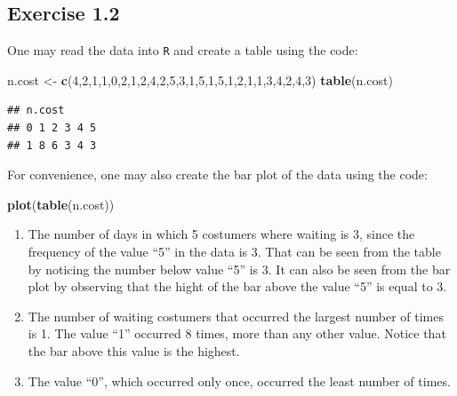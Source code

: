 \documentclass[
]{krantz}
\makeatletter
\newenvironment{Shaded}{\begin{snugshade}}{\end{snugshade}}
\newcommand{\DecValTok}[1]{\textcolor[rgb]{0.00,0.00,0.81}{#1}}
\newcommand{\KeywordTok}[1]{\textcolor[rgb]{0.13,0.29,0.53}{\textbf{#1}}}
\newcommand{\NormalTok}[1]{#1}
\newcommand{\StringTok}[1]{\textcolor[rgb]{0.31,0.60,0.02}{#1}}
\newenvironment{kframe}{%
\medskip{}
\setlength{\fboxsep}{.8em}
 \def\at@end@of@kframe{}%
 \ifinner\ifhmode%
  \def\at@end@of@kframe{\end{minipage}}%
  \begin{minipage}{\columnwidth}%
 \fi\fi%
 \def\FrameCommand##1{\hskip\@totalleftmargin \hskip-\fboxsep
 \colorbox{shadecolor}{##1}\hskip-\fboxsep
     \hskip-\linewidth \hskip-\@totalleftmargin \hskip\columnwidth}%
 \MakeFramed {\advance\hsize-\width
   \@totalleftmargin\z@ \linewidth\hsize
   \@setminipage}}%
 {\par\unskip\endMakeFramed%
 \at@end@of@kframe}
\renewenvironment{Shaded}{\begin{kframe}}{\end{kframe}}
\theoremstyle{definition}
\theoremstyle{definition}
\theoremstyle{definition}
\theoremstyle{remark}
\makeatother
\begin{document}
\hypertarget{exercise-1.2}{%
\subsection*{Exercise 1.2}\label{exercise-1.2}}


One may read the data into \texttt{R} and create a table using the code:

\begin{Shaded}
\begin{Highlighting}[]
\NormalTok{    n.cost <-}\StringTok{ }\KeywordTok{c}\NormalTok{(}\DecValTok{4}\NormalTok{,}\DecValTok{2}\NormalTok{,}\DecValTok{1}\NormalTok{,}\DecValTok{1}\NormalTok{,}\DecValTok{0}\NormalTok{,}\DecValTok{2}\NormalTok{,}\DecValTok{1}\NormalTok{,}\DecValTok{2}\NormalTok{,}\DecValTok{4}\NormalTok{,}\DecValTok{2}\NormalTok{,}\DecValTok{5}\NormalTok{,}\DecValTok{3}\NormalTok{,}\DecValTok{1}\NormalTok{,}\DecValTok{5}\NormalTok{,}\DecValTok{1}\NormalTok{,}\DecValTok{5}\NormalTok{,}\DecValTok{1}\NormalTok{,}\DecValTok{2}\NormalTok{,}\DecValTok{1}\NormalTok{,}\DecValTok{1}\NormalTok{,}\DecValTok{3}\NormalTok{,}\DecValTok{4}\NormalTok{,}\DecValTok{2}\NormalTok{,}\DecValTok{4}\NormalTok{,}\DecValTok{3}\NormalTok{)}
    \KeywordTok{table}\NormalTok{(n.cost)}
\end{Highlighting}
\end{Shaded}

\begin{verbatim}
## n.cost
## 0 1 2 3 4 5 
## 1 8 6 3 4 3
\end{verbatim}

For convenience, one may also create the bar plot of the data using the code:

\begin{Shaded}
\begin{Highlighting}[]
\KeywordTok{plot}\NormalTok{(}\KeywordTok{table}\NormalTok{(n.cost))}
\end{Highlighting}
\end{Shaded}

\begin{enumerate}
\def\labelenumi{\arabic{enumi}.}
\item
  The number of days in which 5 costumers where waiting is 3, since the frequency of the value ``5'' in the data is 3. That can be seen from the table by noticing the number below value ``5'' is 3. It can also be seen from the bar plot by observing that the hight of the bar above the value ``5'' is equal to 3.
\item
  The number of waiting costumers that occurred the largest number of times is 1. The value ``1'' occurred 8 times, more than any other value. Notice that the bar above this value is the highest.
\item
  The value ``0'', which occurred only once, occurred the least number of times.
\end{enumerate}
\end{document}

